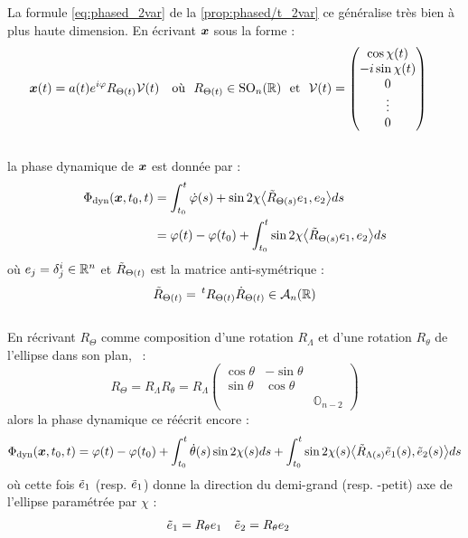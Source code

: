 \begin{proposition}\label{prop:phased_nvar}
	La formule \eqref{eq:phased_2var} de la \cref{prop:phased/t_2var} ce généralise très bien à plus haute dimension. En écrivant $\bf{x}$ sous la forme :
	\begin{align}\label{eq:exp_elliptik_nvar}
		\bf{x}(t) &= a(t)e^{i\varphi} R_{\Theta(t)} \mathcal{V}(t)  &  \text{où }\ R_{\Theta(t)} \in\SO_n(\R)  \ \text{ et }\  \mathcal{V}(t) &= \begin{pmatrix} \cos\chi(t) \\ -i\sin\chi(t) \\ 0 \\ \vdots \\ 0 \end{pmatrix}
	\end{align}
	\\
	la phase dynamique de $\bf{x}$ est donnée par :
	\begin{equation}\label{eq:phased_nvar-v1}
		\begin{aligned}
			\phased(\bf{x}, t_0,t) &= \int_{t_0}^t \dot{\varphi}(s) + \sin2\chi \big\langle \Tilde{R}_{\Theta(s)} e_1, e_2\big\rangle ds \\
			&= \varphi(t) -\varphi(t_0) + \int_{t_0}^t \sin2\chi \big\langle \Tilde{R}_{\Theta(s)} e_1, e_2\big\rangle ds
		\end{aligned}
	\end{equation}
	où $e_j=\delta^i_j\in\R^n$ et $\Tilde{R}_{\Theta(t)}$ est la matrice anti-symétrique :
	\[\Tilde{R}_{\Theta(t)} =\, ^tR_{\Theta(t)} \dot{R}_{\Theta(t)}\in\mathcal{A}_n(\R)\]
	\\
	En récrivant $R_\Theta$ comme composition d'une rotation $R_\Lambda$ et d'une rotation $R_\theta$ de l'ellipse dans son plan, \ie~:
	\[R_\Theta = R_\Lambda R_\theta = R_\Lambda \begin{pmatrix}\cos\theta & -\sin\theta \\ \sin\theta & \cos\theta \\ & & \mathbb{O}_{n-2}
	\end{pmatrix}\]
	alors la phase dynamique ce réécrit encore :
	\begin{equation}\label{eq:phased_nvar-v2}
		\phased(\bf{x}, t_0,t) = \varphi(t) -\varphi(t_0) + \int_{t_0}^t \dot{\theta}(s) \sin2\chi(s) ds + \int_{t_0}^t \sin2\chi(s) \big\langle \Tilde{R}_{\Lambda(s)} \Tilde{e}_1(s),  \Tilde{e}_2(s)\big\rangle ds
	\end{equation}
	où cette fois $\Tilde{e}_1$ (resp. $\Tilde{e}_1$) donne la direction du demi-grand (resp. -petit) axe de l'ellipse paramétrée par $\chi$ :
	\begin{align*}
		\Tilde{e}_1 &= R_\theta e_1  &   \Tilde{e}_2 &= R_\theta e_2
	\end{align*}
\end{proposition}

